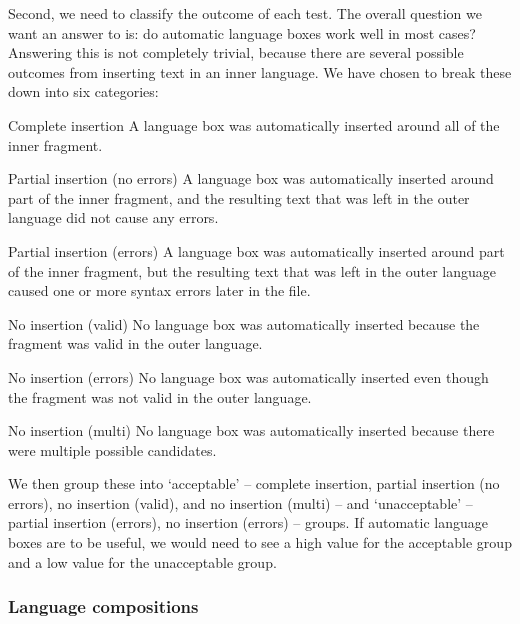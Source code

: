 \documentclass[sigplan,screen]{acmart}\settopmatter{printfolios=true,printccs=false,printacmref=false}
\begin{document}
Second, we need to classify the outcome of each test. The overall question we
want an answer to is: do automatic language boxes work well in most
cases? Answering this is not completely trivial, because there are several
possible outcomes from inserting text in an inner language. We have chosen to
break these down into six categories:

\begin{description*}
  \item[Complete insertion] A language box was automatically inserted around
    all of the inner fragment.
  \item[Partial insertion (no errors)] A language box was automatically
    inserted around part of the inner fragment, and the resulting text that was left
    in the outer language did not cause any errors.
  \item[Partial insertion (errors)] A language box was automatically inserted
    around part of the inner fragment, but the resulting text that was left
    in the outer language caused one or more syntax errors later in the file.
  \item[No insertion (valid)] No language box was automatically inserted because
    the fragment was valid in the outer language.
  \item[No insertion (errors)] No language box was automatically inserted even
    though the fragment was not valid in the outer language.
  \item[No insertion (multi)] No language box was automatically inserted because
    there were multiple possible candidates.
\end{description*}

We then group these into `acceptable' -- complete insertion, partial insertion
(no errors), no insertion (valid), and no insertion (multi) -- and
`unacceptable' -- partial insertion (errors), no insertion (errors) -- groups.
If automatic language boxes are to be useful, we would need to see a high value
for the acceptable group and a low value for the unacceptable group.


\subsubsection{Language compositions}
\end{document}
